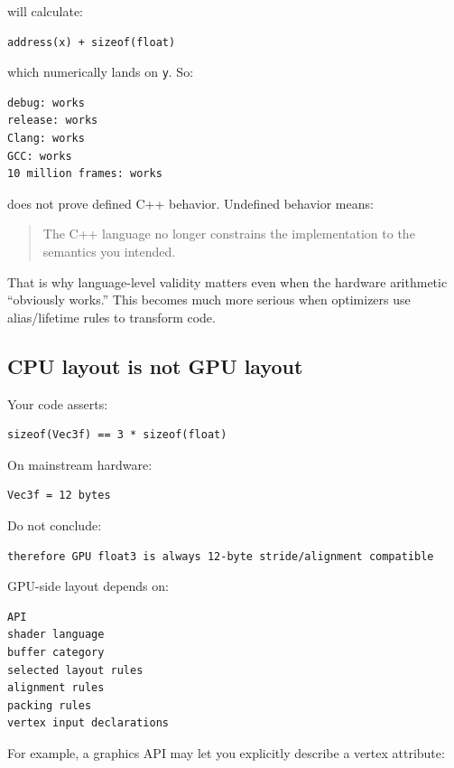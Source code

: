 will calculate:

\begin{verbatim}
address(x) + sizeof(float)
\end{verbatim}

which numerically lands on \texttt{y}. So:

\begin{verbatim}
debug: works
release: works
Clang: works
GCC: works
10 million frames: works
\end{verbatim}

does not prove defined C++ behavior. Undefined behavior means:

\begin{quote}
The C++ language no longer constrains the implementation to the semantics you intended.
\end{quote}

That is why language-level validity matters even when the hardware arithmetic ``obviously works.'' This becomes much more serious when optimizers use alias/lifetime rules to transform code.

\subsection{CPU layout is not GPU layout}\label{01-foundations-i-ch003-cpu-layout-is-not-gpu-layout}

Your code asserts:

\begin{verbatim}
sizeof(Vec3f) == 3 * sizeof(float)
\end{verbatim}

On mainstream hardware:

\begin{verbatim}
Vec3f = 12 bytes
\end{verbatim}

Do not conclude:

\begin{verbatim}
therefore GPU float3 is always 12-byte stride/alignment compatible
\end{verbatim}

GPU-side layout depends on:

\begin{verbatim}
API
shader language
buffer category
selected layout rules
alignment rules
packing rules
vertex input declarations
\end{verbatim}

For example, a graphics API may let you explicitly describe a vertex attribute:

